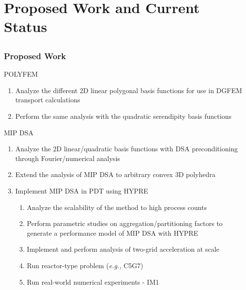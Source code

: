 \documentclass[compress,10pt]{beamer}
\begin{document}
\section{Proposed Work and Current Status}
\subsection{}
\begin{frame}[t]\frametitle{Proposed Work}
\begin{block}{POLYFEM}
\begin{enumerate}
	\item Analyze the different 2D linear polygonal basis functions for use in DGFEM transport calculations
	\item Perform the same analysis with the quadratic serendipity basis functions
\end{enumerate}
\end{block}
\begin{block}{MIP DSA}
\begin{enumerate}
	\item Analyze the 2D linear/quadratic basis functions with DSA preconditioning through Fourier/numerical analysis
	\item Extend the analysis of MIP DSA to arbitrary convex 3D polyhedra
	\item Implement MIP DSA in PDT using HYPRE
	\begin{enumerate}
		\item Analyze the scalability of the method to high process counts
		\item Perform parametric studies on aggregation/partitioning factors to generate a performance model of MIP DSA with HYPRE
		\item Implement and perform analysis of two-grid acceleration at scale
		\item Run reactor-type problem ({\em e.g.,} C5G7)
		\item Run real-world numerical experiments - IM1
	\end{enumerate}
\end{enumerate}
\end{block}
\end{frame}
\end{document}
